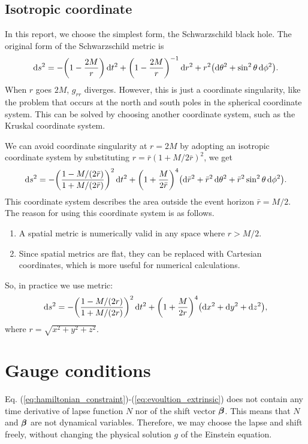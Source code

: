 \subsection{Isotropic coordinate}

In this report, we choose the simplest form, the Schwarzschild black hole. The original form of the Schwarzschild metric is
\begin{equation}
	\dd{s^2} = - \qty(1 - \frac{2M}{r}) \dd{t^2} + \qty(1 - \frac{2M}{r})^{-1}\dd{r^2}+r^2\qty(\dd{\theta^2}+\sin^2\theta\dd{\phi^2}).
\end{equation}
When $r$ goes $2M$, $g_{rr}$ diverges. However, this is just a coordinate singularity, like the problem that occurs at the north and south poles in the spherical coordinate system\parencite{zee2013einstein}. This can be solved by choosing another coordinate system, such as the Kruskal coordinate system.

We can avoid coordinate singularity at $r=2M$ by adopting an isotropic coordinate system by substituting $r=\bar{r}(1+M/2\bar{r})^2$, we get
\begin{equation}
	\dd{s^2} = - \qty(\frac{1-M/(2\bar{r})}{1+M/(2\bar{r})})^2 \dd{t^2} + \qty(1 + \frac{M}{2\bar{r}})^{4}\qty(\dd{\bar{r}^2}+\bar{r}^2\dd{\theta^2}+\bar{r}^2\sin^2\theta\dd{\phi^2}).
\end{equation}
This coordinate system describes the area outside the event horizon $\bar{r}=M/2$. The reason for using this coordinate system is as follows.
\begin{enumerate}
	\item A spatial metric is numerically valid in any space where $r>M/2$.
	\item Since spatial metrics are flat, they can be replaced with Cartesian coordinates, which is more useful for numerical calculations\parencite{brugmann1996adaptive}.
\end{enumerate}
So, in practice we use metric:
\begin{equation}
	\dd{s^2} = - \qty(\frac{1-M/(2r)}{1+M/(2r)})^2 \dd{t^2} + \qty(1 + \frac{M}{2r})^{4}\qty(\dd{x^2}+\dd{y^2}+\dd{z^2}),
\end{equation}
where $r = \sqrt{x^2 + y^2 + z^2}$.

\section{Gauge conditions}
Eq. (\ref{eq:hamiltonian_constraint})-(\ref{eq:evoultion_extrinsic}) does not contain any time derivative of lapse function $N$ nor of the shift vector $\bm{\beta}$. This means that $N$ and $\bm{\beta}$ are not dynamical variables. Therefore, we may choose the lapse and shift freely, without changing the physical solution $g$ of the Einstein equation\parencite{gourgoulhon20123+}.

